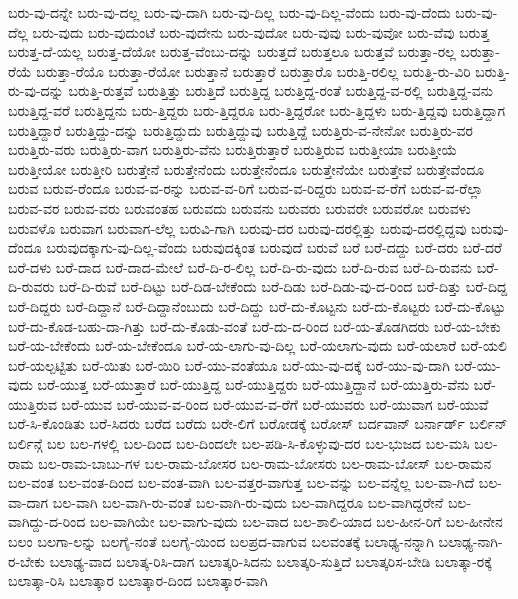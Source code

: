 {ಬರು-ವು-ದನ್ನೇ
ಬರು-ವು-ದಲ್ಲ
ಬರು-ವು-ದಾಗಿ
ಬರು-ವು-ದಿಲ್ಲ
ಬರು-ವು-ದಿಲ್ಲ-ವೆಂದು
ಬರು-ವು-ದೆಂದು
ಬರು-ವು-ದೆಲ್ಲ
ಬರು-ವುದು
ಬರು-ವುದುಂಟೆ
ಬರು-ವುದೇನು
ಬರು-ವುದೋ
ಬರು-ವುವು
ಬರು-ವುವೋ
ಬರು-ವೆವು
ಬರುತ್ತ
ಬರುತ್ತ-ದೆ-ಯಲ್ಲ
ಬರುತ್ತ-ದೆಯೋ
ಬರುತ್ತ-ವೆಂಬು-ದನ್ನು
ಬರುತ್ತದೆ
ಬರುತ್ತಲೂ
ಬರುತ್ತವೆ
ಬರುತ್ತಾ-ರಲ್ಲ
ಬರುತ್ತಾ-ರೆಯೆ
ಬರುತ್ತಾ-ರೆಯೊ
ಬರುತ್ತಾ-ರೆಯೋ
ಬರುತ್ತಾನೆ
ಬರುತ್ತಾರೆ
ಬರುತ್ತಾರೊ
ಬರುತ್ತಿ-ರಲಿಲ್ಲ
ಬರುತ್ತಿ-ರು-ವಿರಿ
ಬರುತ್ತಿ-ರು-ವು-ದನ್ನು
ಬರುತ್ತಿ-ರುತ್ತವೆ
ಬರುತ್ತಿತ್ತು
ಬರುತ್ತಿದೆ
ಬರುತ್ತಿದ್ದ
ಬರುತ್ತಿದ್ದ-ರಂತೆ
ಬರುತ್ತಿದ್ದ-ವ-ರಲ್ಲಿ
ಬರುತ್ತಿದ್ದ-ವನು
ಬರುತ್ತಿದ್ದ-ವರೆ
ಬರುತ್ತಿದ್ದನು
ಬರು-ತ್ತಿದ್ದರು
ಬರು-ತ್ತಿದ್ದರೂ
ಬರು-ತ್ತಿದ್ದರೋ
ಬರು-ತ್ತಿದ್ದಳು
ಬರು-ತ್ತಿದ್ದವು
ಬರುತ್ತಿದ್ದಾಗ
ಬರುತ್ತಿದ್ದಾರೆ
ಬರುತ್ತಿದ್ದು-ದನ್ನು
ಬರುತ್ತಿದ್ದುದು
ಬರುತ್ತಿದ್ದುವು
ಬರುತ್ತಿದ್ದೆ
ಬರುತ್ತಿರು-ವ-ನೇನೋ
ಬರುತ್ತಿರು-ವರ
ಬರುತ್ತಿರು-ವರು
ಬರುತ್ತಿರು-ವಾಗ
ಬರುತ್ತಿರು-ವೆನು
ಬರುತ್ತಿರುತ್ತಾರೆ
ಬರುತ್ತಿರುವ
ಬರುತ್ತೀಯಾ
ಬರುತ್ತೀಯೆ
ಬರುತ್ತೀಯೋ
ಬರುತ್ತೀರಿ
ಬರುತ್ತೇನೆ
ಬರುತ್ತೇನೆಂದು
ಬರುತ್ತೇನೆಂದೂ
ಬರುತ್ತೇನೆಯೇ
ಬರುತ್ತೇವೆ
ಬರುತ್ತೇವೆಂದೂ
ಬರುವ
ಬರುವ-ರೆಂದೂ
ಬರುವ-ವ-ರನ್ನು
ಬರುವ-ವ-ರಿಗೆ
ಬರುವ-ವ-ರಿದ್ದರು
ಬರುವ-ವ-ರೆಗೆ
ಬರುವ-ವ-ರೆಲ್ಲಾ
ಬರುವ-ವರ
ಬರುವ-ವರು
ಬರುವಂತಹ
ಬರುವದು
ಬರುವನು
ಬರುವರು
ಬರುವರೇ
ಬರುವರೋ
ಬರುವಳು
ಬರುವಳೊ
ಬರುವಾಗ
ಬರುವಾಗ-ಲೆಲ್ಲ
ಬರುವಿ-ಗಾಗಿ
ಬರುವು-ದರ
ಬರುವು-ದರಲ್ಲಿತ್ತು
ಬರುವು-ದರಲ್ಲಿದ್ದವು
ಬರುವು-ದೆಂದೂ
ಬರುವುದಕ್ಕಾಗು-ವು-ದಿಲ್ಲ-ವೆಂದು
ಬರುವುದಕ್ಕಿಂತ
ಬರುವುದೆ
ಬರುವೆ
ಬರೆ
ಬರೆ-ದದ್ದು
ಬರೆ-ದರು
ಬರೆ-ದರೆ
ಬರೆ-ದಳು
ಬರೆ-ದಾದ
ಬರೆ-ದಾದ-ಮೇಲೆ
ಬರೆ-ದಿ-ರ-ಲಿಲ್ಲ
ಬರೆ-ದಿ-ರು-ವುದು
ಬರೆ-ದಿ-ರುವ
ಬರೆ-ದಿ-ರುವನು
ಬರೆ-ದಿ-ರುವರು
ಬರೆ-ದಿ-ರುವೆ
ಬರೆ-ದಿಟ್ಟು
ಬರೆ-ದಿಡ-ಬೇಕೆಂದು
ಬರೆ-ದಿಡು
ಬರೆ-ದಿಡು-ವು-ದ-ರಿಂದ
ಬರೆ-ದಿತ್ತು
ಬರೆ-ದಿದ್ದ
ಬರೆ-ದಿದ್ದರು
ಬರೆ-ದಿದ್ದಾನೆ
ಬರೆ-ದಿದ್ದಾನೆಂಬುದು
ಬರೆ-ದಿದ್ದು
ಬರೆ-ದು-ಕೊಟ್ಟನು
ಬರೆ-ದು-ಕೊಟ್ಟರು
ಬರೆ-ದು-ಕೊಟ್ಟು
ಬರೆ-ದು-ಕೊಡ-ಬಹು-ದಾ-ಗಿತ್ತು
ಬರೆ-ದು-ಕೊಡು-ವಂತೆ
ಬರೆ-ದು-ದ-ರಿಂದ
ಬರೆ-ಯ-ತೊಡಗಿದರು
ಬರೆ-ಯ-ಬೇಕು
ಬರೆ-ಯ-ಬೇಕೆಂದು
ಬರೆ-ಯ-ಬೇಕೆಂದೂ
ಬರೆ-ಯ-ಲಾಗು-ವು-ದಿಲ್ಲ
ಬರೆ-ಯಲಾಗು-ವುದು
ಬರೆ-ಯಲಾರೆ
ಬರೆ-ಯಲಿ
ಬರೆ-ಯಲ್ಪಟ್ಟಿತು
ಬರೆ-ಯಿತು
ಬರೆ-ಯಿರಿ
ಬರೆ-ಯು-ವಂತೆಯೂ
ಬರೆ-ಯು-ವು-ದಕ್ಕೆ
ಬರೆ-ಯು-ವು-ದಾಗಿ
ಬರೆ-ಯು-ವುದು
ಬರೆ-ಯುತ್ತ
ಬರೆ-ಯುತ್ತಾರೆ
ಬರೆ-ಯುತ್ತಿದ್ದ
ಬರೆ-ಯುತ್ತಿದ್ದರು
ಬರೆ-ಯುತ್ತಿದ್ದಾನೆ
ಬರೆ-ಯುತ್ತಿರು-ವೆನು
ಬರೆ-ಯುತ್ತಿರುವ
ಬರೆ-ಯುವ
ಬರೆ-ಯುವ-ವ-ರಿಂದ
ಬರೆ-ಯುವ-ವ-ರೆಗೆ
ಬರೆ-ಯುವರು
ಬರೆ-ಯುವಾಗ
ಬರೆ-ಯುವೆ
ಬರೆ-ಸಿ-ಕೊಂಡಿತು
ಬರೆ-ಸಿದರು
ಬರೆದ
ಬರೆದು
ಬರೇ-ಲಿಗೆ
ಬರೋಡಕ್ಕೆ
ಬರೋಸ್
ಬರ್ದವಾನ್
ಬರ್ನಾರ್ಡ್
ಬರ್ಲಿನ್
ಬರ್ಲಿನ್ಗೆ
ಬಲ
ಬಲ-ಗಳಲ್ಲಿ
ಬಲ-ದಿಂದ
ಬಲ-ದಿಂದಲೇ
ಬಲ-ಪಡಿ-ಸಿ-ಕೊಳ್ಳುವು-ದರ
ಬಲ-ಭುಜದ
ಬಲ-ಮಸಿ
ಬಲ-ರಾಮ
ಬಲ-ರಾಮ-ಬಾಬು-ಗಳ
ಬಲ-ರಾಮ-ಬೋಸರ
ಬಲ-ರಾಮ-ಬೋಸರು
ಬಲ-ರಾಮ-ಬೋಸ್
ಬಲ-ರಾಮನ
ಬಲ-ವಂತ
ಬಲ-ವಂತ-ದಿಂದ
ಬಲ-ವಂತ-ವಾಗಿ
ಬಲ-ವತ್ತರ-ವಾಗುತ್ತ
ಬಲ-ವನ್ನು
ಬಲ-ವನ್ನೆಲ್ಲ
ಬಲ-ವಾ-ಗಿದೆ
ಬಲ-ವಾ-ದಾಗ
ಬಲ-ವಾಗಿ
ಬಲ-ವಾಗಿ-ರು-ವಂತೆ
ಬಲ-ವಾಗಿ-ರು-ವುದು
ಬಲ-ವಾಗಿದ್ದರೂ
ಬಲ-ವಾಗಿದ್ದರೇನೆ
ಬಲ-ವಾಗಿದ್ದು-ದ-ರಿಂದ
ಬಲ-ವಾಗಿಯೇ
ಬಲ-ವಾಗು-ವುದು
ಬಲ-ವಾದ
ಬಲ-ಶಾಲಿ-ಯಾದ
ಬಲ-ಹೀನ-ರಿಗೆ
ಬಲ-ಹೀನೇನ
ಬಲಂ
ಬಲಗಾ-ಲನ್ನು
ಬಲಗೈ-ನಂತೆ
ಬಲಗೈ-ಯಿಂದ
ಬಲಪ್ರದ-ವಾಗುವ
ಬಲವಂತಕ್ಕೆ
ಬಲಾಢ್ಯ-ನನ್ನಾಗಿ
ಬಲಾಢ್ಯ-ನಾಗಿ-ರ-ಬೇಕು
ಬಲಾಢ್ಯ-ವಾದ
ಬಲಾತ್ಕ-ರಿಸಿ-ದಾಗ
ಬಲಾತ್ಕರಿ-ಸಿದನು
ಬಲಾತ್ಕರಿ-ಸುತ್ತಿದೆ
ಬಲಾತ್ಕರಿಸ-ಬೇಡಿ
ಬಲಾತ್ಕಾ-ರಕ್ಕೆ
ಬಲಾತ್ಕಾ-ರಿಸಿ
ಬಲಾತ್ಕಾರ
ಬಲಾತ್ಕಾರ-ದಿಂದ
ಬಲಾತ್ಕಾರ-ವಾಗಿ
}
